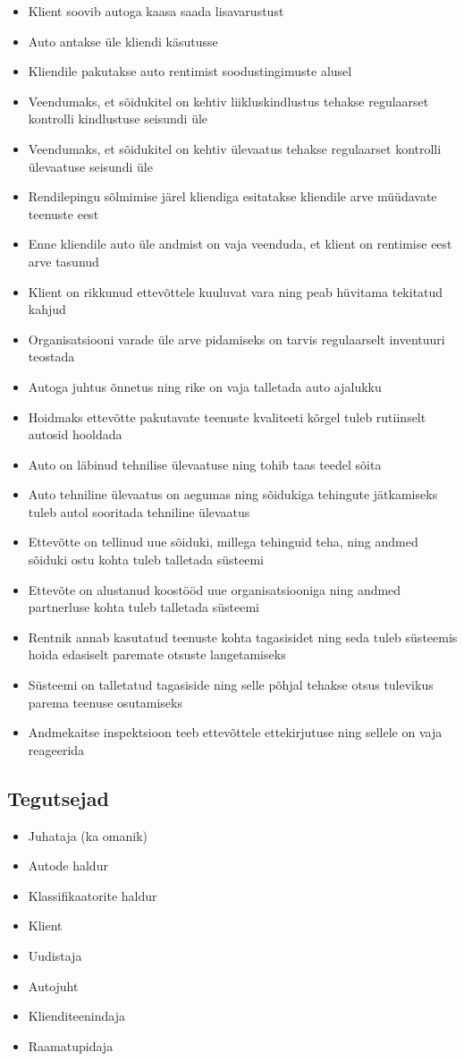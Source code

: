 \begin{itemize}
	\item Klient soovib autoga kaasa saada lisavarustust
	\item Auto antakse üle kliendi käsutusse 
	\item Kliendile pakutakse auto rentimist soodustingimuste alusel
	\item Veendumaks, et sõidukitel on kehtiv liikluskindlustus tehakse regulaarset kontrolli kindlustuse seisundi üle
	\item Veendumaks, et sõidukitel on kehtiv ülevaatus tehakse regulaarset kontrolli ülevaatuse seisundi üle
	\item Rendilepingu sõlmimise järel kliendiga esitatakse kliendile arve müüdavate teenuste eest
	\item Enne kliendile auto üle andmist on vaja veenduda, et klient on rentimise eest arve tasunud
	\item Klient on rikkunud ettevõttele kuuluvat vara ning peab hüvitama tekitatud kahjud
	\item Organisatsiooni varade üle arve pidamiseks on tarvis regulaarselt inventuuri teostada
	\item Autoga juhtus õnnetus ning rike on vaja talletada auto ajalukku
	\item Hoidmaks ettevõtte pakutavate teenuste kvaliteeti kõrgel tuleb rutiinselt autosid hooldada
	\item Auto on läbinud tehnilise ülevaatuse ning tohib taas teedel sõita
	\item Auto tehniline ülevaatus on aegumas ning sõidukiga tehingute jätkamiseks tuleb autol sooritada tehniline ülevaatus
	\item Ettevõtte on tellinud uue sõiduki, millega tehinguid teha, ning andmed sõiduki ostu kohta tuleb talletada süsteemi
	\item Ettevõte on alustanud koostööd uue organisatsiooniga ning andmed partnerluse kohta tuleb talletada süsteemi
	\item Rentnik annab kasutatud teenuste kohta tagasisidet ning seda tuleb süsteemis hoida edasiselt paremate otsuste langetamiseks
	\item Süsteemi on talletatud tagasiside ning selle põhjal tehakse otsus tulevikus parema teenuse osutamiseks
	\item Andmekaitse inspektsioon teeb ettevõttele ettekirjutuse ning sellele on vaja reageerida
\end{itemize}

\subsection{Tegutsejad}
\begin{itemize}
	\item Juhataja (ka omanik)
	\item Autode haldur
	\item Klassifikaatorite haldur
	\item Klient
	\item Uudistaja
	\item Autojuht
	\item Klienditeenindaja
	\item Raamatupidaja
\end{itemize}

